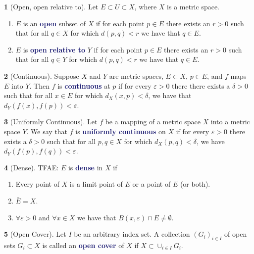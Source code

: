 \documentclass[12pt]{article}
\numberwithin{equation}{section}
\newcommand{\navy}[1]{\textcolor{MidnightBlue}{\bf #1}}
\theoremstyle{plain}
\theoremstyle{definition}
\newtheorem{definition}{\color{MidnightBlue}{\textbf{Definition}}}[section]
\newcommand{\1}{\mathbbm 1}
\def\d{\delta}
\newcommand{\e}{\varepsilon}
\begin{document}
\begin{definition}[Open, open relative to]
Let $E \subset U \subset X$, where $X$ is a metric space.
\begin{enumerate}
\item $E$ is an \navy{open} subset of $X$ if for each point $p \in E$ there exists an $r > 0$ such that for all $q \in X$ for which $d(p,q) < r$ we have that $q \in E$.
\item $E$ is \navy{open relative to} $Y$ if for each point $p \in E$ there exists an $r > 0$ such that for all $q \in Y$ for which $d(p,q) < r$ we have that $q \in E$.
\end{enumerate}
\end{definition}

\begin{definition}[Continuous]
Suppose $X$ and $Y$ are metric spaces, $E \subset X$, $p \in E$, and $f$ maps $E$ into $Y$. Then $f$ is \navy{continuous} at $p$ if for every $\e > 0$ there there exists a $\d > 0$ such that for all $x \in E$ for which $d_X(x,p) < \d$, we have that $d_Y(f(x), f(p)) < \e$.
\end{definition}

\begin{definition}[Uniformly Continuous]
Let $f$ be a mapping of a metric space $X$ into a metric space $Y$. We say that $f$ is \navy{uniformly continuous} on $X$ if for every $\e > 0$ there exists a $\d > 0$ such that for all $p,q \in X$ for which $d_X(p,q) < \delta$, we have $d_Y(f(p),f(q)) < \e$.
\end{definition}

\begin{definition}[Dense] TFAE: $E$ is \navy{dense} in $X$ if
\begin{enumerate}
\item  Every point of $X$ is a limit point of $E$ or a point of $E$ (or both).
\item $\bar{E} = X$.
\item $\forall \e > 0$ and $\forall x \in X$ we have that $B(x,\e) \cap E \neq \emptyset$.
\end{enumerate}
\end{definition}

\begin{definition}[Open Cover]
Let $I$ be an arbitrary index set. A collection $(G_i)_{i \in I}$ of open sets $G_i \subset X$ is called an \navy{open cover} of $X$ if $X \subset \cup_{i \in I} G_{i}$.
\end{definition}
\end{document}
